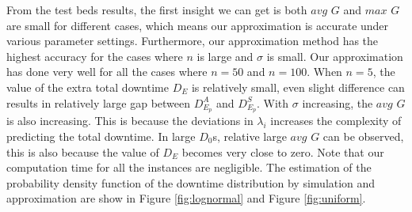 \documentclass[preprint,12pt]{elsarticle}
\begin{document}
From the test beds results, the first insight we can get is both $avg$ $G$ and $max$ $G$ are small for different cases, which means our approximation is accurate under various parameter settings. Furthermore, our approximation method has the highest accuracy for the cases where $n$ is large and $\sigma$ is small. Our approximation has done very well for all the cases where $n=50$ and $n=100$. When $n=5$, the value of the extra total downtime $D_{E}$ is relatively small, even slight difference can results in relatively large gap between $D_{E_{p}}^{A}$ and $D_{E_{p}}^{S}$. With $\sigma$ increasing, the $avg$ $G$ is also increasing. This is because the deviations in $\lambda_{i}$ increases the complexity of predicting the total downtime. In large $D_{0}$s, relative large $avg$ $G$ can be observed, this is also because the value of $D_{E}$ becomes very close to zero. Note that our computation time for all the instances are negligible. The estimation of the probability density function of the downtime distribution by simulation and approximation are show in Figure \ref{fig:lognormal} and Figure \ref{fig:uniform}.

\end{document}
